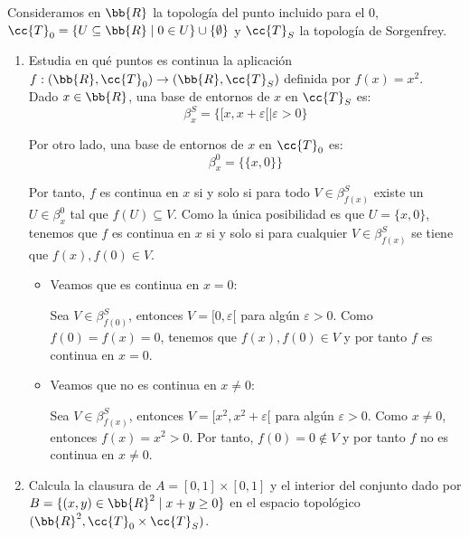 \documentclass[12pt]{article}
\newcommand{\T}[0]{\cc{T}}
\begin{document}
    \begin{ejercicio}[4 puntos] Consideramos en $\bb{R}$ la topología del punto incluido para el $0$, $\T_0=\{U\subseteq\bb{R}\mid 0\in U\}\cup \{\emptyset\}$ y
        $\T_S$ la topología de Sorgenfrey.
        \begin{enumerate}
            \item Estudia en qué puntos es continua la aplicación $f:(\bb{R},\T_0)\to(\bb{R},\T_S)$ definida por $f(x)=x^2$.\\
            
            Dado $x\in \bb{R}$, una base de entornos de $x$ en $\T_S$ es:
            \begin{equation*}
                \beta_x^S = \{[x,x+\varepsilon[\mid \varepsilon>0\}
            \end{equation*}

            Por otro lado, una base de entornos de $x$ en $\T_0$ es:
            \begin{equation*}
                \beta_x^0 = \{\{x,0\}\}
            \end{equation*}

            Por tanto, $f$ es continua en $x$ si y solo si para todo $V\in \beta_{f(x)}^S$ existe un $U\in \beta_x^0$ tal que $f(U)\subseteq V$.
            Como la única posibilidad es que $U=\{x,0\}$,
            tenemos que $f$ es continua en $x$ si y solo si para cualquier $V\in \beta_{f(x)}^S$ se tiene que $f(x), f(0)\in V$.

            \begin{itemize}
                \item Veamos que es continua en $x=0$:
                
                Sea $V\in \beta_{f(0)}^S$, entonces $V=[0,\varepsilon[$ para algún $\varepsilon>0$.
                Como $f(0)=f(x)=0$, tenemos que $f(x),f(0)\in V$ y por tanto $f$ es continua en $x=0$.
                
                \item Veamos que no es continua en $x\neq 0$:
                
                Sea $V\in \beta_{f(x)}^S$, entonces $V=[x^2,x^2+\varepsilon[$ para algún $\varepsilon>0$.
                Como $x\neq 0$, entonces $f(x)=x^2> 0$. Por tanto, $f(0)=0\notin V$ y por tanto $f$ no es continua en $x\neq 0$.
            \end{itemize}
            

            \item Calcula la clausura de $A=[0,1]\times [0,1]$ y el interior del conjunto dado por $B=\{(x,y)\in\bb{R}^2\mid x+y\geq 0\}$ en 
            el espacio topológico $(\bb{R}^2,\T_0\times \T_S)$.
        \end{enumerate}
        
    \end{ejercicio}
\end{document}
